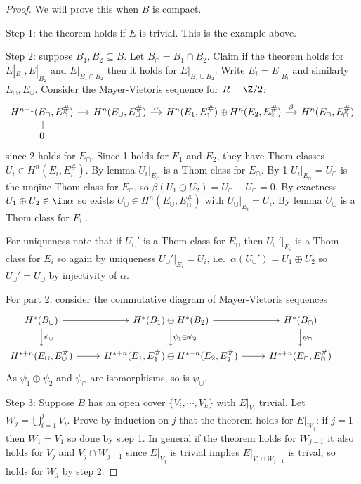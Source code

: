 \documentclass[a4paper]{article}
\begin{document}
\begin{proof}
  We will prove this when \(B\) is compact.

  Step 1: the theorem holds if \(E\) is trivial. This is the example above.

  Step 2: suppose \(B_1, B_2 \subseteq B\). Let \(B_\cap = B_1 \cap B_2\). Claim if the theorem holds for \(E|_{B_1}, E|_{B_2}\) and \(E|_{B_1 \cap B_2}\) then it holds for \(E|_{B_1 \cup B_2}\). Write \(E_i = E|_{B_i}\) and similarly \(E_\cap, E_\cup\). Consider the Mayer-Vietoris sequence for \(R = \Z/2\):
  \[
    \begin{tikzcd}[column sep=small,row sep=small]
      H^{n - 1}(E_\cap, E_\cap^\#) \ar[d, equal] \ar[r] & H^n(E_\cup, E_\cup^\#) \ar[r, "\alpha"] & H^n(E_1, E_1^\#) \oplus H^n(E_2, E_2^\#) \ar[r, "\beta"] & H^n(E_\cap, E_\cap^\#) \\
      0
    \end{tikzcd}
  \]
  since \(2\) holds for \(E_\cap\). Since 1 holds for \(E_1\) and \(E_2\), they have Thom classes \(U_i \in H^n(E_i, E_i^\#)\). By lemma \(U_i|_{E_\cap}\) is a Thom class for \(E_\cap\). By 1 \(U_i|_{E_\cap} = U_\cap\) is the unqiue Thom class for \(E_\cap\), so \(\beta(U_1 \oplus U_2) = U_\cap - U_\cap = 0\). By exactness \(U_1 \oplus U_2 \in \im \alpha\) so exists \(U_\cup \in H^n(E_\cup, E_\cup^\#)\) with \(U_\cup|_{E_i} = U_i\). By lemma \(U_\cup\) is a Thom class for \(E_\cup\).

  For uniqueness note that if \(U_\cup'\) is a Thom class for \(E_\cup\) then \(U_\cup'|_{E_i}\) is a Thom class for \(E_i\) so again by uniqueness \(U_\cup'|_{E_i} = U_i\), i.e.\ \(\alpha(U_\cup') = U_1 \oplus U_2\) so \(U_\cup' = U_\cup\) by injectivity of \(\alpha\).

  For part 2, consider the commutative diagram of Mayer-Vietoris sequences
  \[
    \begin{tikzcd}
      H^*(B_\cup) \ar[r] \ar[d, "\psi_\cup"] & H^*(B_1) \oplus H^*(B_2) \ar[r] \ar[d, "\psi_1 \oplus \psi_2"] & H^*(B_\cap) \ar[d, "\psi_\cap"] & \\
      H^{* + n}(E_\cup, E_\cup^\#) \ar[r] & H^{* + n}(E_1, E_1^\#) \oplus H^{* + n}(E_2, E_2^\#) \ar[r] & H^{* + n}(E_\cap, E_\cap^\#)
    \end{tikzcd}
  \]
  As \(\psi_1 \oplus \psi_2\) and \(\psi_\cap\) are isomorphisms, so is \(\psi_\cup\).

  Step 3: Suppose \(B\) has an open cover \(\{V_i, \cdots, V_k\}\) with \(E|_{V_i}\) trivial. Let \(W_j = \bigcup_{i = 1}^j V_i\). Prove by induction on \(j\) that the theorem holds for \(E|_{W_j}\): if \(j = 1\) then \(W_1 = V_1\) so done by step 1. In general if the theorem holds for \(W_{j - 1}\) it also holds for \(V_j\) and \(V_j \cap W_{j - 1}\) since \(E|_{V_j}\) is trivial implies \(E|_{V_j \cap W_{j - 1}}\) is trival, so holds for \(W_j\) by step 2.
\end{proof}
\end{document}
